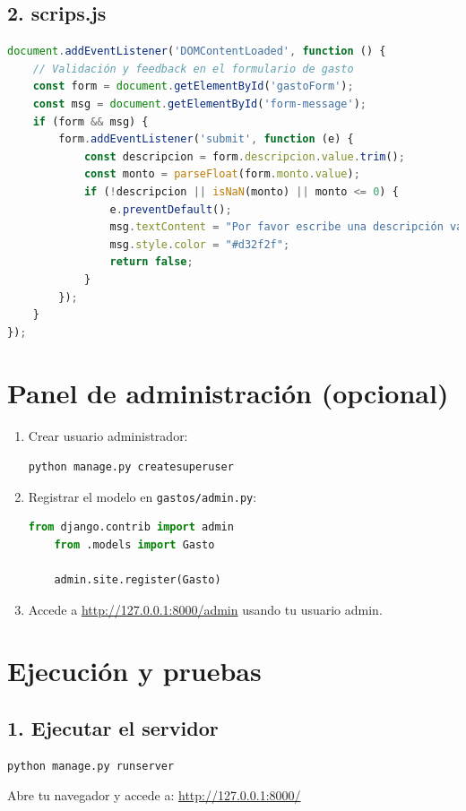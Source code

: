 \documentclass[12pt,a4paper]{article}
\begin{document}
\subsection{2. scrips.js}
\begin{lstlisting}[language=JavaScript]
document.addEventListener('DOMContentLoaded', function () {
    // Validación y feedback en el formulario de gasto
    const form = document.getElementById('gastoForm');
    const msg = document.getElementById('form-message');
    if (form && msg) {
        form.addEventListener('submit', function (e) {
            const descripcion = form.descripcion.value.trim();
            const monto = parseFloat(form.monto.value);
            if (!descripcion || isNaN(monto) || monto <= 0) {
                e.preventDefault();
                msg.textContent = "Por favor escribe una descripción válida y un monto mayor a 0.";
                msg.style.color = "#d32f2f";
                return false;
            }
        });
    }
});
\end{lstlisting}

\section{Panel de administración (opcional)}

\begin{enumerate}
    \item Crear usuario administrador:
    \begin{lstlisting}[language=bash]
    python manage.py createsuperuser
    \end{lstlisting}
    \item Registrar el modelo en \texttt{gastos/admin.py}:
    \begin{lstlisting}[language=Python]
    from django.contrib import admin
    from .models import Gasto

    admin.site.register(Gasto)
    \end{lstlisting}
    \item Accede a \url{http://127.0.0.1:8000/admin} usando tu usuario admin.
\end{enumerate}

\section{Ejecución y pruebas}

\subsection{1. Ejecutar el servidor}
\begin{lstlisting}[language=bash]
python manage.py runserver
\end{lstlisting}
Abre tu navegador y accede a: \url{http://127.0.0.1:8000/}
\end{document}
